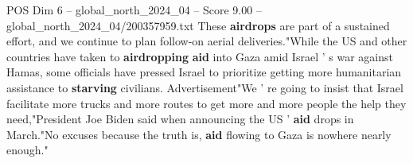 \begin{textsample}{POS Dim 6 – global\_north\_2024\_04 – Score 9.00 – global\_north\_2024\_04/200357959.txt}
These \textbf{airdrops} are part of a sustained effort, and we continue to plan follow-on aerial deliveries."While the US and other countries have taken to \textbf{airdropping} \textbf{aid} into Gaza amid Israel ' s war against Hamas, some officials have pressed Israel to prioritize getting more humanitarian assistance to \textbf{starving} civilians.
Advertisement"We ' re going to insist that Israel facilitate more trucks and more routes to get more and more people the help they need,"President Joe Biden said when announcing the US ' \textbf{aid} drops in March."No excuses because the truth is, \textbf{aid} flowing to Gaza is nowhere nearly enough."

\end{textsample}
